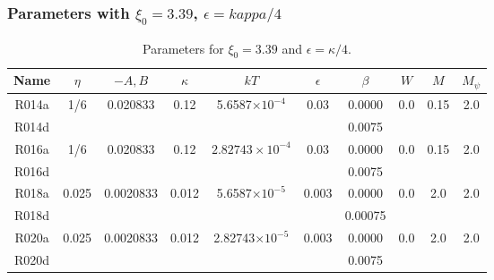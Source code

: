 \subsubsection{Parameters with $\xi_0 = 3.39$, $\epsilon = kappa/4$}

\begin{table}[h]
\begin{center}
\begin{tabular}{|c|c|c|c|c|c|c|c|c|c|}
\hline
Name & $\eta$ & $-A,B$ & $\kappa$ & $kT$ & $\epsilon$ & $\beta$ & $W$
     & $M$ & $M_\psi$\\
\hline
R014a & 1/6 & 0.020833 & 0.12 & 5.6587$\times 10^{-4}$ & 0.03 & 0.0000 & 0.0 
      & 0.15 & 2.0 \\
R014d &  &  &  & & & 0.0075 &  &  &  \\
\hline
R016a & 1/6 & 0.020833 & 0.12 & $2.82743\times 10^{-4}$ & 0.03 & 0.0000 & 0.0 
      & 0.15 & 2.0 \\
R016d & &  &  &  & & 0.0075 &  &  &  \\
\hline
R018a & 0.025 & 0.0020833 & 0.012 & 5.6587$\times 10^{-5}$ & 0.003
      & 0.0000 & 0.0 & 2.0 & 2.0 \\
R018d & &  &  &  & & 0.00075 &  &  &  \\
\hline
R020a & 0.025 & 0.0020833 & 0.012 & 2.82743$\times 10^{-5}$ & 0.003
      & 0.0000 & 0.0 & 2.0 & 2.0 \\
R020d & &  &  &  & & 0.0075 &  &  &  \\
\hline
\end{tabular}
\caption{Parameters for $\xi_0 = 3.39$ and $\epsilon = \kappa/4$.}
\end{center}
\end{table}


